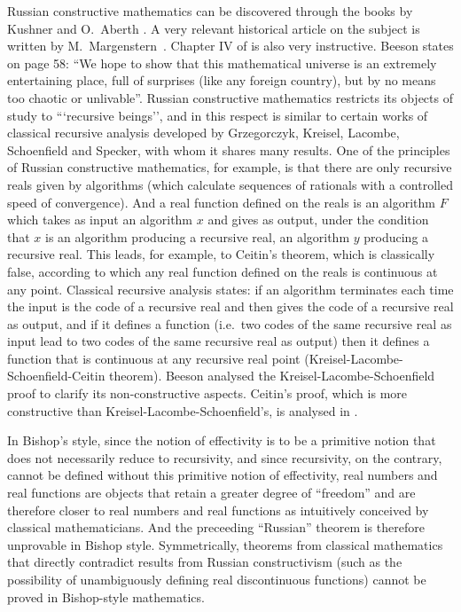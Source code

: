 Russian constructive mathematics can be discovered through the books by Kushner \cite{Ku} and O.\ Aberth \cite{Ab}. 
A very relevant historical article on the subject is written by M.\ Margenstern~\cite{Ma}. 
Chapter IV of \cite[Beeson]{Be} is also very instructive. 
Beeson states on page 58: ``We hope to show that this mathematical universe is an extremely entertaining place, full of surprises (like any foreign country), but by no means too chaotic or unlivable''. 
Russian constructive mathematics restricts its objects of study to ```recursive beings'', and in this respect is similar to certain works of classical recursive analysis developed by Grzegorczyk, Kreisel, Lacombe, Schoenfield and Specker, with whom it shares many results.
 One of the principles of Russian constructive mathematics, for example, is that there are only recursive reals given by algorithms (which calculate sequences of rationals with a controlled speed of convergence). 
And a real function defined on the reals is an algorithm $F$ which takes as input an algorithm $x$ and gives as output, under the condition that $x$ is an algorithm producing a recursive real, an algorithm $y$ producing a recursive real. 
This leads, for example, to Ceitin's theorem, which is classically false, according to which any real function defined on the reals is continuous at any point.
Classical recursive analysis states: if an algorithm terminates each time the input is the code of a recursive real and then gives the code of a recursive real as output, and if it defines a function (i.e.\ two codes of the same recursive real as input lead to two codes of the same recursive real as output) then it defines a function that is continuous at any recursive real point (Kreisel-Lacombe-Schoenfield-Ceitin theorem). 
Beeson analysed the Kreisel-Lacombe-Schoenfield proof to clarify its non-constructive aspects. 
Ceitin's proof, which is more constructive than Kreisel-Lacombe-Schoenfield's, is analysed in \cite{BR}.
 
In Bishop's style, since the notion of effectivity is  to be a primitive notion that does not necessarily reduce to recursivity, and since recursivity, on the contrary, cannot be defined without this primitive notion of effectivity, real numbers and real functions are objects that retain a greater degree of ``freedom'' and are therefore closer to real numbers and real functions as intuitively conceived by classical mathematicians. 
And the preceeding ``Russian'' theorem is therefore unprovable in Bishop style. Symmetrically, theorems from classical mathematics that directly contradict results from Russian constructivism (such as the possibility of unambiguously defining real discontinuous functions) cannot be proved in Bishop-style mathematics. 

